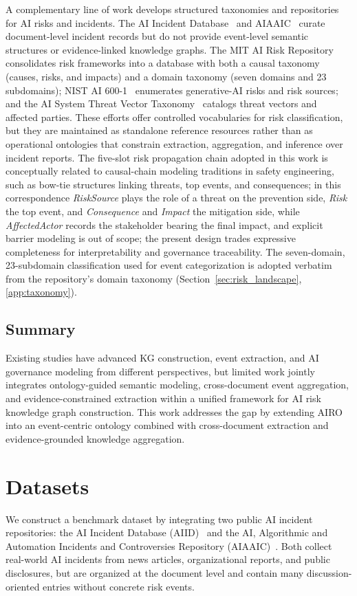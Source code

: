 \documentclass[a4paper,fleqn]{cas-dc}
\begin{document}
A complementary line of work develops structured taxonomies and
repositories for AI risks and incidents.
The AI Incident Database~\cite{McGregor_2021} and
AIAAIC~\cite{10772925} curate document-level incident records but do
not provide event-level semantic structures or evidence-linked
knowledge graphs.
The MIT AI Risk Repository~\cite{slattery2026airisk} consolidates
risk frameworks into a database with both a causal taxonomy (causes,
risks, and impacts) and a domain taxonomy (seven domains and 23
subdomains);
NIST AI 600-1~\cite{nist_ai_600_1} enumerates generative-AI
risks and risk sources; and the AI System Threat Vector
Taxonomy~\cite{huwyler2025threatvector} catalogs threat vectors and
affected parties.
These efforts offer controlled vocabularies for risk classification,
but they are maintained as standalone reference resources rather than
as operational ontologies that constrain extraction, aggregation, and
inference over incident reports.
The five-slot risk propagation chain adopted in this work is
conceptually related to causal-chain modeling traditions in safety
engineering, such as bow-tie structures linking threats, top events,
and consequences; in this correspondence \textit{RiskSource} plays
the role of a threat on the prevention side, \textit{Risk} the top
event, and \textit{Consequence} and \textit{Impact} the mitigation
side, while \textit{AffectedActor} records the stakeholder bearing
the final impact, and explicit barrier modeling is out of scope; the
present design trades expressive completeness
for interpretability and governance traceability.
The seven-domain, 23-subdomain classification used for event
categorization is adopted verbatim from the repository's domain
taxonomy (Section~\ref{sec:risk_landscape},
\ref{app:taxonomy}).

\subsection{Summary}

Existing studies have advanced KG construction, event extraction, and AI
governance modeling from different perspectives, but limited work
jointly integrates ontology-guided semantic modeling, cross-document
event aggregation, and evidence-constrained extraction within a
unified framework for AI risk knowledge graph construction.
This work addresses the gap by extending AIRO into an event-centric ontology
combined with cross-document extraction and evidence-grounded knowledge
aggregation.

\section{Datasets}
\label{sec:dataset}
We construct a benchmark dataset by integrating two public AI incident
repositories: the AI Incident Database (AIID)~\cite{McGregor_2021} and the AI,
Algorithmic and Automation Incidents and Controversies Repository
(AIAAIC)~\cite{10772925}.
Both collect real-world AI incidents from news articles, organizational
reports, and public disclosures, but are organized at the document level
and contain many discussion-oriented entries without concrete risk
events.
\end{document}

